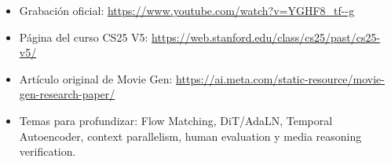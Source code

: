 \begin{itemize}[itemsep=0.2em,topsep=0.2em]
  \item Grabación oficial: \url{https://www.youtube.com/watch?v=YGHF8_tf--g}
  \item Página del curso CS25 V5: \url{https://web.stanford.edu/class/cs25/past/cs25-v5/}
  \item Artículo original de Movie Gen: \url{https://ai.meta.com/static-resource/movie-gen-research-paper/}
  \item Temas para profundizar: Flow Matching, DiT/AdaLN, Temporal Autoencoder, context parallelism, human evaluation y media reasoning verification.
\end{itemize}


